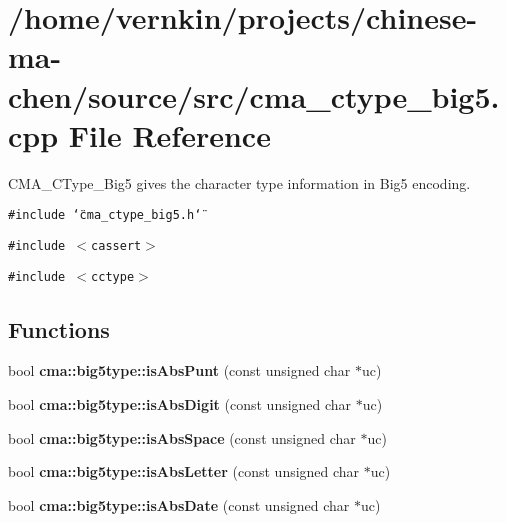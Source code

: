 \section{/home/vernkin/projects/chinese-ma-chen/source/src/cma\_\-ctype\_\-big5.cpp File Reference}
\label{cma__ctype__big5_8cpp}
CMA\_\-CType\_\-Big5 gives the character type information in Big5 encoding.  


{\tt \#include \char`\"{}cma\_\-ctype\_\-big5.h\char`\"{}}\par
{\tt \#include $<$cassert$>$}\par
{\tt \#include $<$cctype$>$}\par
\subsection*{Functions}
\begin{CompactItemize}
\item 
bool {\bf cma::big5type::isAbsPunt} (const unsigned char $\ast$uc)
\item 
bool {\bf cma::big5type::isAbsDigit} (const unsigned char $\ast$uc)
\item 
bool {\bf cma::big5type::isAbsSpace} (const unsigned char $\ast$uc)
\item 
bool {\bf cma::big5type::isAbsLetter} (const unsigned char $\ast$uc)
\item 
bool {\bf cma::big5type::isAbsDate} (const unsigned char $\ast$uc)
\end{CompactItemize}
